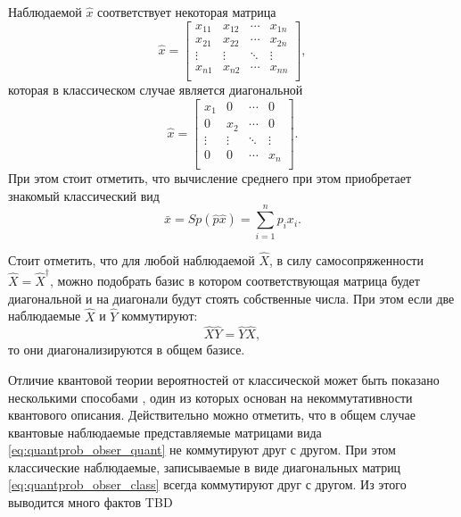 Наблюдаемой $\hat{x}$ соответствует некоторая матрица
\begin{equation}
\hat{x} = \begin{bmatrix}
x_{11} & x_{12} & \cdots & x_{1n} \\
x_{21} & x_{22} & \cdots & x_{2n} \\
\vdots & \vdots & \ddots & \vdots \\
x_{n1} & x_{n2} & \cdots & x_{nn} \\
\end{bmatrix},
\label{eq:quantprob_obser_quant}
\end{equation}
которая в классическом случае является диагональной 
\begin{equation}
\hat{x} = \begin{bmatrix}
x_1 & 0 & \cdots & 0 \\
0 & x_2 & \cdots & 0 \\
\vdots & \vdots & \ddots & \vdots \\
0 & 0 & \cdots & x_n \\
\end{bmatrix}.
\label{eq:quantprob_obser_class}
\end{equation}
При этом стоит отметить, что вычисление среднего при этом приобретает
знакомый классический вид
\begin{equation}
\bar{x} = Sp\left(\hat{p} \hat{x}\right) = \sum_{i=1}^n p_i x_i.
\nonumber
\end{equation}
\begin{remark}
  Стоит отметить, что для любой наблюдаемой $\hat{X}$, в силу
  самосопряженности $\hat{X} = \hat{X}^\dag$, можно подобрать
  базис в котором соответствующая матрица будет диагональной и на
  диагонали будут стоять собственные числа. При этом если две
  наблюдаемые $\hat{X}$ и $\hat{Y}$ коммутируют:  
  \[
  \hat{X} \hat{Y} = \hat{Y} \hat{X},
  \]
  то они диагонализируются в общем базисе.
\end{remark}

Отличие квантовой теории вероятностей от классической может быть
показано несколькими способами \cite{bHolevo2003, bHolevo2003add},
один из которых основан на некоммутативности квантового описания.
Действительно можно отметить, что в общем случае квантовые наблюдаемые
представляемые матрицами вида \eqref{eq:quantprob_obser_quant} не
коммутируют друг с другом. При этом классические наблюдаемые,
записываемые в виде диагональных матриц
\eqref{eq:quantprob_obser_class} всегда коммутируют друг с другом. Из
этого выводится много фактов TBD


